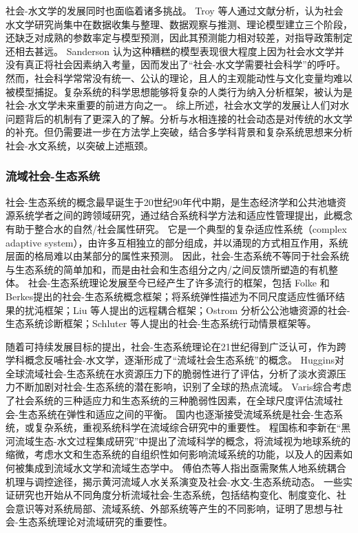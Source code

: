 社会-水文学的发展同时也面临着诸多挑战。
Troy 等人通过文献分析，认为社会水文学研究尚集中在数据收集与整理、数据观察与推测、理论模型建立三个阶段，还缺乏对成熟的参数率定与模型预测，因此其预测能力相对较差，对指导政策制定还相去甚远\cite{troy2015}。
Sanderson 认为这种糟糕的模型表现很大程度上因为社会水文学并没有真正将社会因素纳入考量，因而发出了“社会-水文学需要社会科学”的呼吁\cite{sanderson2017}。
然而，社会科学常常没有统一、公认的理论，且人的主观能动性与文化变量均难以被模型捕捉。复杂系统的科学思想能够将复杂的人类行为纳入分析框架，被认为是社会-水文学未来重要的前进方向之一\cite{ahlstrom2021}。
综上所述，社会水文学的发展让人们对水问题背后的机制有了更深入的了解。分析与水相连接的社会动态是对传统的水文学的补充。但仍需要进一步在方法学上突破，结合多学科背景和复杂系统思想来分析社会-水文系统，以突破上述瓶颈。


\subsubsection*{流域社会-生态系统}

社会-生态系统的概念最早诞生于20世纪90年代中期，是生态经济学和公共池塘资源系统学者之间的跨领域研究，通过结合系统科学方法和适应性管理提出\cite{biggs2021}，此概念有助于整合水的自然/社会属性研究\cite{fowler2022}。
它是一个典型的复杂适应性系统（complex adaptive system），由许多互相独立的部分组成，并以涌现的方式相互作用，系统层面的格局难以由某部分的属性来预测\cite{schluter2019}。
因此，社会-生态系统不等同于社会系统与生态系统的简单加和，而是由社会和生态组分之内/之间反馈所塑造的有机整体\cite{biggs2021}。
社会-生态系统理论发展至今已经产生了许多流行的框架，包括 Folke 和 Berkes提出的社会-生态系统概念框架\cite{berkes2008}；将系统弹性描述为不同尺度适应性循环结果的扰沌框架\cite{gunderson2001}；Liu 等人提出的远程耦合框架\cite{liu2018}；Ostrom 分析公公池塘资源的社会-生态系统诊断框架\cite{ostrom2009}；Schluter 等人提出的社会-生态系统行动情景框架等\cite{schluter2019}。

随着可持续发展目标的提出，社会-生态系统理论在21世纪得到广泛认可，作为跨学科概念反哺社会-水文学，逐渐形成了“流域社会生态系统”的概念。
Huggins对全球流域社会-生态系统在水资源压力下的脆弱性进行了评估，分析了淡水资源压力不断加剧对社会-生态系统的潜在影响，识别了全球的热点流域\cite{huggins2022}。
Varis综合考虑了社会系统的三种适应力和生态系统的三种脆弱性因素，在全球尺度评估流域社会-生态系统在弹性和适应之间的平衡\cite{varis2019}。
国内也逐渐接受流域系统是社会-生态系统，或复杂系统，重视系统科学在流域综合研究中的重要性。
程国栋和李新在“黑河流域生态-水文过程集成研究”中提出了流域科学的概念，将流域视为地球系统的缩微，考虑水文和生态系统的自组织性如何影响流域系统的功能，以及人的因素如何被集成到流域水文学和流域生态学中\cite{cheng2015}。
傅伯杰等人指出亟需聚焦人地系统耦合机理与调控途径，揭示黄河流域人水关系演变及社会-水文-生态系统动态\cite{fu2021a}。
一些实证研究也开始从不同角度分析流域社会-生态系统，包括结构变化\cite{song2022}、制度变化\cite{wang2019d}、社会意识\cite{liu2023}等对系统局部、流域系统、外部系统等产生的不同影响，证明了思想与社会-生态系统理论对流域研究的重要性。

